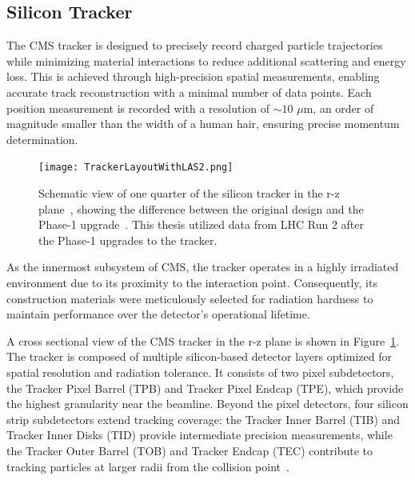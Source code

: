 \subsection{Silicon Tracker}

The CMS tracker is designed to precisely record charged particle trajectories while minimizing material interactions to reduce additional scattering and energy loss. This is achieved through high-precision spatial measurements, enabling accurate track reconstruction with a minimal number of data points. Each position measurement is recorded with a resolution of $\sim10$ $\mu$m, an order of magnitude smaller than the width of a human hair, ensuring precise momentum determination.

\begin{figure}[!hbt]
    \begin{center}
        \texttt{[image: TrackerLayoutWithLAS2.png]}
        \caption{Schematic view of one quarter of the silicon tracker in the r-z plane~\cite{Adam:2748381}, showing the difference between the original design and the Phase-1 upgrade~\cite{Collaboration:1355706, CMS:2012sda}. This thesis utilized data from LHC Run 2 after the Phase-1 upgrades to the tracker.}
        \label{fig:silicontracker}
    \end{center}
\end{figure}

As the innermost subsystem of CMS, the tracker operates in a highly irradiated environment due to its proximity to the interaction point. Consequently, its construction materials were meticulously selected for radiation hardness to maintain performance over the detector’s operational lifetime.

A cross sectional view of the CMS tracker in the r-z plane is shown in Figure~\ref{fig:silicontracker}. The tracker is composed of multiple silicon-based detector layers optimized for spatial resolution and radiation tolerance. It consists of two pixel subdetectors, the Tracker Pixel Barrel (TPB) and Tracker Pixel Endcap (TPE), which provide the highest granularity near the beamline. Beyond the pixel detectors, four silicon strip subdetectors extend tracking coverage: the Tracker Inner Barrel (TIB) and Tracker Inner Disks (TID) provide intermediate precision measurements, while the Tracker Outer Barrel (TOB) and Tracker Endcap (TEC) contribute to tracking particles at larger radii from the collision point~\cite{Chatrchyan:1667597}. 


